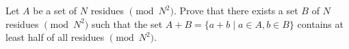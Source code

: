 Let $A$ be a set of $N$ residues $\pmod{N^2}$. Prove that there exists a set $B$ of $N$ residues $\pmod{N^2}$ such that the set $A + B = \{a + b \mid a \in A, b \in B\}$ contains at least half of all residues $\pmod{N^2}$.

